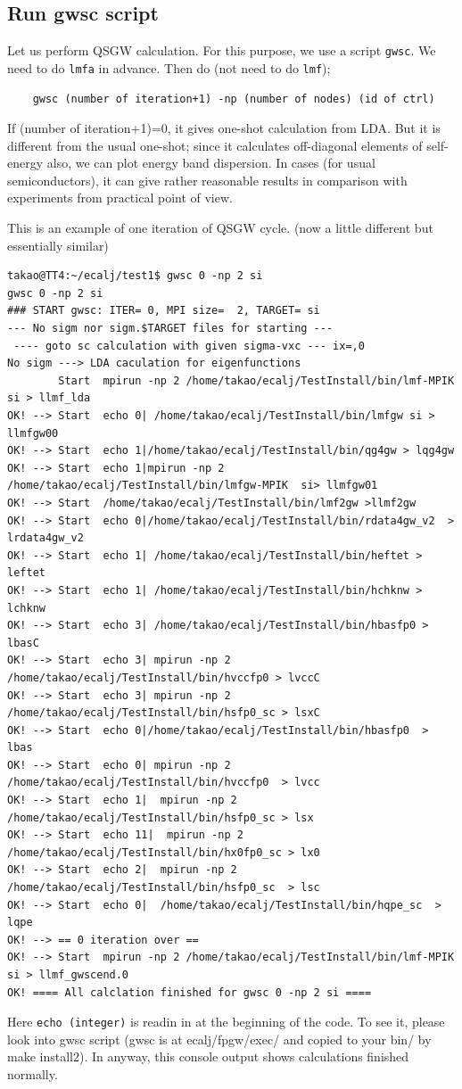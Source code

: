 \documentclass[a4paper,10pt,epsf,fleqn]{article}
\begin{document}
\subsection{Run gwsc script}
\label{fpgw-calc}
Let us perform QSGW calculation. 
For this purpose, we use a script \verb+gwsc+. 
We need to do \verb+lmfa+ in advance. Then do (not need to do \verb+lmf+);
\begin{verbatim}
    gwsc (number of iteration+1) -np (number of nodes) (id of ctrl)
\end{verbatim}
If (number of iteration+1)=0, it gives one-shot calculation from LDA.
But it is different from the usual one-shot;
since it calculates off-diagonal elements of self-energy also,
we can plot energy band dispersion. In cases (for usual
semiconductors), it can give rather reasonable results in comparison with
experiments from practical point of view.

This is an example of one iteration of QSGW cycle.
(now a little different but essentially similar)
\begin{verbatim}
takao@TT4:~/ecalj/test1$ gwsc 0 -np 2 si
gwsc 0 -np 2 si
### START gwsc: ITER= 0, MPI size=  2, TARGET= si
--- No sigm nor sigm.$TARGET files for starting ---
 ---- goto sc calculation with given sigma-vxc --- ix=,0
No sigm ---> LDA caculation for eigenfunctions 
        Start  mpirun -np 2 /home/takao/ecalj/TestInstall/bin/lmf-MPIK  si > llmf_lda 
OK! --> Start  echo 0| /home/takao/ecalj/TestInstall/bin/lmfgw si > llmfgw00 
OK! --> Start  echo 1|/home/takao/ecalj/TestInstall/bin/qg4gw > lqg4gw 
OK! --> Start  echo 1|mpirun -np 2 /home/takao/ecalj/TestInstall/bin/lmfgw-MPIK  si> llmfgw01 
OK! --> Start  /home/takao/ecalj/TestInstall/bin/lmf2gw >llmf2gw
OK! --> Start  echo 0|/home/takao/ecalj/TestInstall/bin/rdata4gw_v2  > lrdata4gw_v2 
OK! --> Start  echo 1| /home/takao/ecalj/TestInstall/bin/heftet > leftet 
OK! --> Start  echo 1| /home/takao/ecalj/TestInstall/bin/hchknw > lchknw 
OK! --> Start  echo 3| /home/takao/ecalj/TestInstall/bin/hbasfp0 > lbasC 
OK! --> Start  echo 3| mpirun -np 2 /home/takao/ecalj/TestInstall/bin/hvccfp0 > lvccC 
OK! --> Start  echo 3| mpirun -np 2 /home/takao/ecalj/TestInstall/bin/hsfp0_sc > lsxC 
OK! --> Start  echo 0|/home/takao/ecalj/TestInstall/bin/hbasfp0  > lbas 
OK! --> Start  echo 0| mpirun -np 2 /home/takao/ecalj/TestInstall/bin/hvccfp0  > lvcc 
OK! --> Start  echo 1|  mpirun -np 2 /home/takao/ecalj/TestInstall/bin/hsfp0_sc > lsx 
OK! --> Start  echo 11|  mpirun -np 2 /home/takao/ecalj/TestInstall/bin/hx0fp0_sc > lx0 
OK! --> Start  echo 2|  mpirun -np 2 /home/takao/ecalj/TestInstall/bin/hsfp0_sc  > lsc 
OK! --> Start  echo 0|  /home/takao/ecalj/TestInstall/bin/hqpe_sc  > lqpe 
OK! --> == 0 iteration over ==
OK! --> Start  mpirun -np 2 /home/takao/ecalj/TestInstall/bin/lmf-MPIK  si > llmf_gwscend.0 
OK! ==== All calclation finished for gwsc 0 -np 2 si ====
\end{verbatim}
Here \verb+echo (integer)+ is readin in at the beginning of the code.
To see it, please look into gwsc script (gwsc is at
ecalj/fpgw/exec/ and copied to your bin/ by make install2). 
In anyway, this console output shows calculations finished normally.
\end{document}
